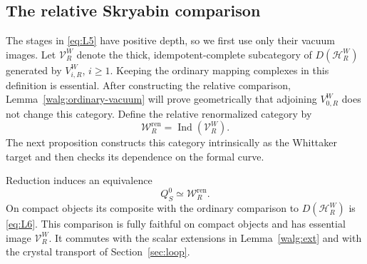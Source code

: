 \subsection{The relative Skryabin comparison}

The stages in \eqref{eq:L5} have positive depth, so we first use
only their vacuum images.  Let \(\mathcal V_R^W\) denote the thick,
idempotent-complete subcategory of \(D(\mathcal H_R^W)\) generated
by \(V_{i,R}^W\), \(i\geq1\).  Keeping the ordinary mapping
complexes in this definition is essential.  After constructing the
relative comparison, Lemma~\ref{walg:ordinary-vacuum} will prove
geometrically that adjoining \(V_{0,R}^W\) does not change this
category.  Define the relative renormalized category by
\[
 \mathcal W_R^{\mathrm{ren}}=
       \operatorname{Ind}(\mathcal V_R^W).
\]
The next proposition constructs this category intrinsically as the
Whittaker target and then checks its dependence on the formal curve.

\begin{proposition}\label{walg:relative-skryabin}
Reduction induces an equivalence
\[
 Q_S^0\simeq\mathcal W_R^{\mathrm{ren}}.
\]
On compact objects its composite with the ordinary comparison to
\(D(\mathcal H_R^W)\) is \eqref{eq:L6}.  This comparison is fully
faithful on compact objects and has essential image
\(\mathcal V_R^W\).  It commutes with the scalar extensions in
Lemma~\ref{walg:ext} and with the crystal transport of
Section~\ref{sec:loop}.
\end{proposition}

